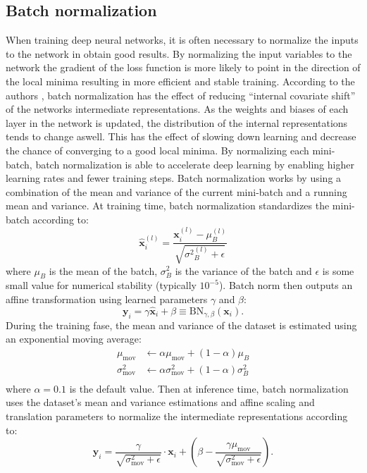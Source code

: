 \documentclass[a4paper,11pt]{article} %
\begin{document}
\subsection{Batch normalization}
When training deep neural networks, it is often necessary to normalize the inputs to the network in obtain good results. By normalizing the input variables to the network the gradient of the loss function is more likely to point in the direction of the local minima resulting in more efficient and stable training. According to the authors \cite{ioffe2015batch}, batch normalization has the effect of reducing ``internal covariate shift'' of the networks intermediate representations. As the weights and biases of each layer in the network is updated, the distribution of the internal representations tends to change aswell. This has the effect of slowing down learning and decrease the chance of converging to a good local minima. By normalizing each mini-batch, batch normalization is able to accelerate deep learning by enabling higher learning rates and fewer training steps. Batch normalization works by using a combination of the mean and variance of the current mini-batch and a running mean and variance. At training time, batch normalization standardizes the mini-batch according to:
\begin{equation}
  \hat{\mathbf{x}}_{i}^{(l)} = \frac{\mathbf{x}^{(l)}_{i}-\mu^{(l)}_{B}}{\sqrt{{\sigma^{2}}^{(l)}_{B}+\epsilon}}
\end{equation}
where $\mu_{B}$ is the mean of the batch, $\sigma_{B}^{2}$ is the variance of the batch and $\epsilon$ is some small value for numerical stability (typically $10^{-5}$). Batch norm then outputs an affine transformation using learned parameters $\gamma$ and $\beta$:
\begin{equation}
  \mathbf{y}_{i} = \gamma \hat{\mathbf{x}}_{i}+\beta \equiv \mathrm{BN}_{\gamma, \beta}\left(\mathbf{x}_{i}\right).
\end{equation}
During the training fase, the mean and variance of the dataset is estimated using an exponential moving average:
\begin{equation}
  \begin{split}
    \mu_\text{mov} &\leftarrow \alpha \mu_\text{mov} + (1 - \alpha)\mu_{B} \\
    \sigma^2_\text{mov} &\leftarrow \alpha \sigma^2_\text{mov} + (1 - \alpha)\sigma^2_{B} \\
  \end{split}
\end{equation}
where $\alpha=0.1$ is the default value. Then at inference time, batch normalization uses the dataset's mean and variance estimations and affine scaling and translation parameters to normalize the intermediate representations according to:
\begin{equation} \label{eq:batch-norm}
  \mathbf{y}_i = \frac{\gamma}{\sqrt{\sigma^{2}_\text{mov} +\epsilon}} \cdot \mathbf{x}_i +\left(\beta - \frac{\gamma \mu_\text{mov}}{\sqrt{\sigma^{2}_\text{mov}+\epsilon}}\right).
\end{equation}
\end{document}
